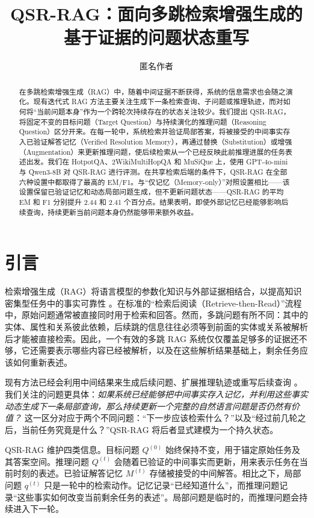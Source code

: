 \documentclass[11pt]{article}
\title{QSR-RAG：面向多跳检索增强生成的\\
	基于证据的问题状态重写}
\author{匿名作者}
\begin{document}
	\maketitle

	\begin{abstract}
		在多跳检索增强生成（RAG）中，随着中间证据不断获得，系统的信息需求也会随之演化。现有迭代式 RAG 方法主要关注生成下一条检索查询、子问题或推理轨迹，而对如何将“当前问题本身”作为一个跨轮次持续存在的状态关注较少。我们提出 QSR-RAG，将固定不变的目标问题（Target Question）与持续演化的推理问题（Reasoning Question）区分开来。在每一轮中，系统检索并验证局部答案，将被接受的中间事实存入已验证解答记忆（Verified Resolution Memory），再通过替换（Substitution）或增强（Augmentation）来更新推理问题，使后续检索从一个已经反映此前推理进展的任务表述出发。我们在 HotpotQA、2WikiMultiHopQA 和 MuSiQue 上，使用 GPT-4o-mini 与 Qwen3-8B 对 QSR-RAG 进行评测。在共享检索后端的条件下，QSR-RAG 在全部六种设置中都取得了最高的 EM/F1。与“仅记忆（Memory-only）”对照设置相比——该设置保留已验证记忆和动态局部问题生成，但不更新问题状态——QSR-RAG 的平均 EM 和 F1 分别提升 2.44 和 2.41 个百分点。结果表明，即使外部记忆已经能够影响后续查询，持续更新当前问题本身仍然能够带来额外收益。
	\end{abstract}

	\section{引言}

	检索增强生成（RAG）将语言模型的参数化知识与外部证据相结合，以提高知识密集型任务中的事实可靠性 \citep{guu2020realm,lewis2020rag,izacard2021fid,gao2023ragsurvey}。在标准的“检索后阅读（Retrieve-then-Read）”流程中，原始问题通常被直接同时用于检索和回答。然而，多跳问题有所不同：其中的实体、属性和关系彼此依赖，后续跳的信息往往必须等到前面的实体或关系被解析后才能被直接检索。因此，一个有效的多跳 RAG 系统仅仅覆盖足够多的证据还不够，它还需要表示哪些内容已经被解析，以及在这些解析结果基础上，剩余任务应该如何重新表述。

	现有方法已经会利用中间结果来生成后续问题、扩展推理轨迹或重写后续查询 \citep{press2023selfask,trivedi2023ircot,shao2023iterretgen,zhu2025chainrag,ji2025dec,kim2025unirag}。我们关注的问题更具体：\emph{如果系统已经能够把中间事实存入记忆，并利用这些事实动态生成下一条局部查询，那么持续更新一个完整的自然语言问题是否仍然有价值？} 这一区分对应于两个不同问题：“下一步应该检索什么？”以及“经过前几轮之后，当前任务究竟是什么？”QSR-RAG 将后者显式建模为一个持久状态。

	QSR-RAG 维护四类信息。目标问题 $Q^{(0)}$ 始终保持不变，用于锚定原始任务及其答案空间。推理问题 $Q^{(t)}$ 会随着已验证的中间事实而更新，用来表示任务在当前时刻的表述。已验证解答记忆 $M^{(t)}$ 存储被接受的中间解答。相比之下，局部问题 $q^{(t)}$ 只是一轮中的检索动作。记忆记录“已经知道什么”，而推理问题记录“这些事实如何改变当前剩余任务的表述”。局部问题是临时的，而推理问题会持续进入下一轮。
\end{document}
